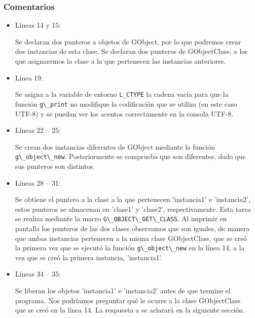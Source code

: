 \subsubsection{Comentarios}
\begin{itemize}
\item Líneas 14 y 15:\par
  Se declaran dos punteros a objetos de \textsf{GObject}, por lo que podremos crear dos
  instancias de esta clase.
  Se declaran dos punteros de \textsf{GObjectClass}, a los que asignaremos la clase a la
  que pertenecen las instancias anteriores.
\item Línea 19:\par
  Se asigna a la variable de entorno \texttt{L\_CTYPE} la cadena vacía para que la
  función \passthrough{\lstinline!g\_print!} no modifique la codificación que se utiliza
  (en este caso UTF-8) y se puedan ver los acentos correctamente en la consola UTF-8.
\item Líneas 22 -- 25:\par
  Se crean dos instancias diferentes de \textsf{GObject} mediante la función
  \passthrough{\lstinline!g\_object\_new!}. Posteriormente se comprueba que son
  diferentes, dado que sus punteros son distintos.
\item Líneas 28 -- 31:\par
  Se obtiene el puntero a la clase a la que pertenecen 'instancia1' e 'instancia2',
  estos punteros se almacenan en 'clase1' y 'clase2', respectivamente. Esta tarea se
  realiza mediante la macro \passthrough{\lstinline!G\_OBJECT\_GET\_CLASS!}. Al imprimir
  en pantalla los punteros de las dos clases observamos que son iguales, de manera que
  ambas instancias pertenecen a la misma clase \textsf{GObjectClass}, que se creó la
  primera vez que se ejecutó la función \passthrough{\lstinline!g\_object\_new!} en la
  línea 14, a la vez que se creó la primera instancia, 'instancia1'.
\item Líneas 34 -- 35:\par
  Se liberan los objetos 'instancia1' e 'instancia2' antes de que termine el programa.
  Nos podríamos preguntar qué le ocurre a la clase \textsf{GObjectClass} que se creó en la línea 14. La respuesta a se aclarará en la siguiente sección.
\end{itemize}

